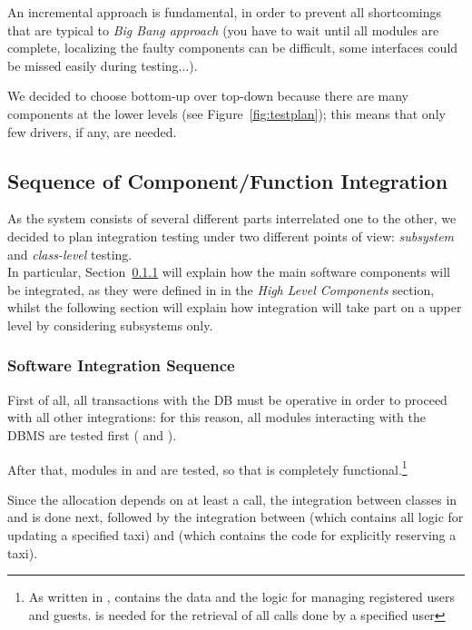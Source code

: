 \documentclass[a4paper, 12pt]{article}
\newcounter{tc}
\begin{document}
An incremental approach is fundamental, in order to prevent all shortcomings that are typical to \emph{Big Bang approach} (you have to wait until all modules are complete, localizing the faulty components can be difficult, some interfaces could be missed easily during testing...).

We decided to choose bottom-up over top-down because there are many components at the lower levels (see Figure~\ref{fig:testplan}); this means that only few drivers, if any, are needed.

\newpage
\subsection{Sequence of Component/Function Integration}
\label{sub:sequence_of_component_function_integration}
As the system consists of several different parts interrelated one to the other, we decided to plan integration testing under two different points of view: \emph{subsystem} and \emph{class-level} testing. \\

In particular, Section~\ref{ssub:software_integration_sequence} will explain how the main software components will be integrated, as they were defined in \cite{bib:dd} in the \emph{High Level Components} section, whilst the following section will explain how integration will take part on a upper level by considering subsystems only.

\subsubsection{Software Integration Sequence}
\label{ssub:software_integration_sequence}


First of all, all transactions with the DB must be operative in order to proceed with all other integrations: for this reason, all modules interacting with the DBMS are tested first ( and ).

After that, modules in  and  are tested, so that  is completely functional.\footnote{As written in \cite{bib:dd},  contains the data and the logic for managing registered users and guests.  is needed for the retrieval of all calls done by a specified user}

Since the allocation depends on at least a call, the integration between classes in  and  is done next, followed by the integration between  (which contains all logic for updating a specified taxi) and  (which contains the code for explicitly reserving a taxi).
\end{document}
